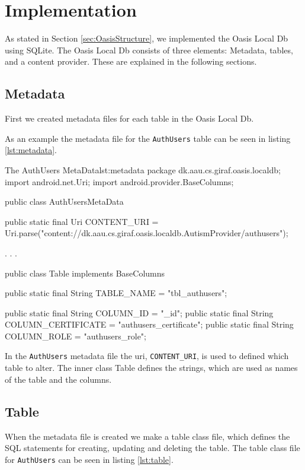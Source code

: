 \section{Implementation}
\label{sec:dbImp}
As stated in Section \vref{sec:OasisStructure}, we implemented the Oasis Local Db using SQLite.
The Oasis Local Db consists of three elements: Metadata, tables, and a content provider.
These are explained in the following sections.

\subsection{Metadata}
First we created metadata files for each table in the Oasis Local Db.

As an example the metadata file for the \texttt{AuthUsers} table can be seen in listing \vref{lst:metadata}.

\begin{Java}{The AuthUsers MetaData}{lst:metadata}
package dk.aau.cs.giraf.oasis.localdb;
import android.net.Uri;
import android.provider.BaseColumns;

public class AuthUsersMetaData {

	public static final Uri CONTENT_URI = Uri.parse("content://dk.aau.cs.giraf.oasis.localdb.AutismProvider/authusers");

	.
	.
	.
	
	public class Table implements BaseColumns {
		public static final String TABLE_NAME = "tbl_authusers";

		public static final String COLUMN_ID = "_id";
		public static final String COLUMN_CERTIFICATE = "authusers_certificate";
		public static final String COLUMN_ROLE = "authusers_role";
	}
}
\end{Java}

In the \texttt{AuthUsers} metadata file the uri, \texttt{CONTENT\_URI}, is used to defined which table to alter. 
The inner class Table defines the strings, which are used as names of the table and the columns.

\subsection{Table}
When the metadata file is created we make a table class file, which defines the SQL statements for creating, updating and deleting the table. The table class file for \texttt{AuthUsers} can be seen in listing \vref{lst:table}.

